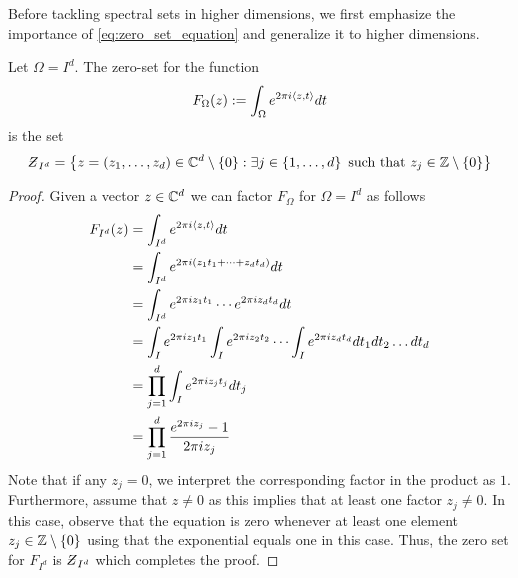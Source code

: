 \documentclass[../thesis.tex]{subfiles}
\begin{document}
Before tackling spectral sets in higher dimensions, we first emphasize the importance of \cref{eq:zero_set_equation} and generalize it to higher dimensions. 
\begin{lemma}\label{lem:zero_set_jp_1_5}
    Let $\Omega=I^d$. The zero-set for the function
    \begin{equation*}
        F_{\Omega} (z):= \int_\Omega e^{2 \pi i \langle z,t\rangle} dt
    \end{equation*}
    is the set
    \begin{equation*}
        \Zstroke_{I^d} = \braqMed{ z = \brac{z_1,\dots,z_d}\in \C^d \setminus \braqMed{0} : \exists \space j \in \braqMed{1,\dots, d} \text{ such that } z_j \in  \intnozero}
    \end{equation*}
\end{lemma}


\begin{proof} %
    Given a vector $z \in \mathbb{C}^d$ we can factor $F_{\Omega}$ for $\Omega = I^d$ as follows
    \begin{align*}
        F_{I^d} (z) &= \int_{I^d} e^{2 \pi i \braa{z,t}} dt\\
        &= \int_{I^d} e^{2\pi i  (z_1 t_1 + \dots +z_d t_d)} dt\\
        &= \int_{I^d} e^{2\pi i z_1 t_1}  \cdots e^{2\pi i z_d t_d}  dt\\
        &= \int_{I} e^{2\pi i z_1 t_1} \int_{I} e^{2\pi i z_2 t_2}  \cdots \int_{I} e^{2\pi i z_d t_d}  dt_1 dt_2\dots dt_d\\ %
        &= \prod_{j=1}^d \int_I e^{2\pi i z_j t_j} dt_j\\
        &= \prod_{j=1}^d \frac{e^{2 \pi i z_j} -1}{2 \pi i z_j}
    \end{align*}
    Note that if any $z_j = 0$, we interpret the corresponding factor in the product as $1$. Furthermore, assume that $z\neq 0$ as this implies that at least one factor $z_j\neq 0$. In this case, observe that the equation is zero whenever at least one element $z_j\in \mathbb{Z}\setminus\{0\}$ using that the exponential equals one in this case. Thus, the zero set for $F_{I^d}$ is $\Zstroke_{I^d}$ which completes the proof. %
\end{proof}
\end{document}
